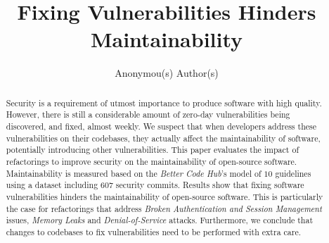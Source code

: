\documentclass[10pt,conference]{IEEEtran}
\begin{document}
\title{Fixing Vulnerabilities Hinders Maintainability}

\author{
    Anonymou(s) Author(s)

}

\maketitle

\begin{abstract}
Security is a requirement of utmost importance to produce software with high
quality. However, there is still a considerable amount of zero-day
vulnerabilities being discovered, and fixed, almost weekly. We suspect that when
developers address these vulnerabilities on their codebases, they actually
affect the maintainability of software, potentially introducing other
vulnerabilities. This paper evaluates the impact of refactorings to improve
security on the maintainability of open-source software. Maintainability is
measured based on the \emph{Better Code Hub}'s model of $10$ guidelines using a
dataset including $607$ security commits. Results show that fixing software
vulnerabilities hinders the maintainability of open-source software. This is
particularly the case for refactorings that address \emph{Broken Authentication
and Session Management} issues, \emph{Memory Leaks} and \emph{Denial-of-Service}
attacks. Furthermore, we conclude that changes to codebases to fix vulnerabilities
need to be performed with extra care.
\end{abstract}
\end{document}
